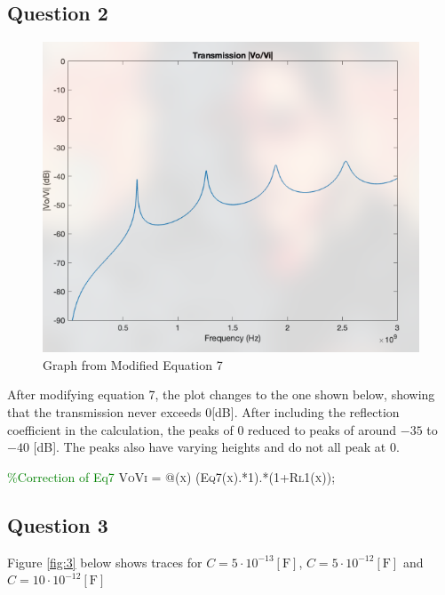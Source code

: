 \documentclass[
	letterpaper, %
	10pt, %
]{CSUniSchoolLabReport}
\begin{document}
\subsection{Question 2}

\begin{figure}[H]
  \centering
  \includegraphics[width=.9\textwidth]{Figures/Lab Three/ModGraph.png}
  \caption{Graph from Modified Equation 7}
  \label{fig:2}
\end{figure}

After modifying equation 7, the plot changes to the one shown below, showing that the transmission never exceeds $0$[dB]. After including the reflection coefficient in the calculation, the peaks of $0$ reduced to peaks of around $-35$ to $-40$ [dB]. The peaks also have varying heights and do not all peak at $0$.

\begin{flushleft}
\textcolor{green}{\%Correction of Eq7}
\textsc{VoVi = @(x) (Eq7(x).*1).*(1+Rl1(x));} 
\end{flushleft}

\subsection{Question 3}

Figure \ref{fig:3} below shows traces for $C=5\cdot10^{-13}[\si{\farad}]$, $C=5\cdot10^{-12}[\si{\farad}]$ and $C=10\cdot10^{-12}[\si{\farad}]$
\end{document}
